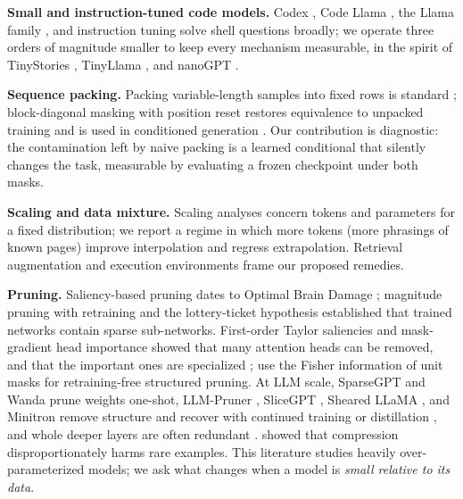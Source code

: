 \documentclass[11pt,a4paper]{article}
\begin{document}
\textbf{Small and instruction-tuned code models.} Codex \citep{chen2021codex},
Code Llama \citep{roziere2023codellama}, the Llama family
\citep{touvron2023llama,grattafiori2024llama3}, and instruction tuning
\citep{ouyang2022instructgpt} solve shell questions broadly; we operate three
orders of magnitude smaller to keep every mechanism measurable, in the spirit
of TinyStories \citep{eldan2023tinystories}, TinyLlama
\citep{zhang2024tinyllama}, and nanoGPT \citep{karpathy2023nanogpt}.

\textbf{Sequence packing.} Packing variable-length samples into fixed rows is
standard \citep{krell2021packing,dao2022flashattention}; block-diagonal
masking with position reset restores equivalence to unpacked training
\citep{krell2021packing} and is used in conditioned generation
\citep{copet2023musicgen}. Our contribution is diagnostic: the contamination
left by naive packing is a learned conditional that silently changes the task,
measurable by evaluating a frozen checkpoint under both masks.

\textbf{Scaling and data mixture.} Scaling analyses
\citep{kaplan2020scaling,hoffmann2022chinchilla} concern tokens and parameters
for a fixed distribution; we report a regime in which more tokens (more
phrasings of known pages) improve interpolation and regress extrapolation.
Retrieval augmentation \citep{lewis2020rag,borgeaud2022retro} and execution
environments \citep{yang2023intercode} frame our proposed remedies.

\textbf{Pruning.} Saliency-based pruning dates to Optimal Brain Damage
\citep{lecun1990obd}; magnitude pruning with retraining
\citep{han2015learning} and the lottery-ticket hypothesis
\citep{frankle2019lottery} established that trained networks contain sparse
sub-networks. First-order Taylor saliencies \citep{molchanov2017pruning} and
mask-gradient head importance \citep{michel2019sixteen} showed that many
attention heads can be removed, and that the important ones are specialized
\citep{voita2019heads}; \citet{kwon2022fast} use the Fisher information of
unit masks for retraining-free structured pruning. At LLM scale, SparseGPT
\citep{frantar2023sparsegpt} and Wanda \citep{sun2024wanda} prune weights
one-shot, LLM-Pruner \citep{ma2023llmpruner}, SliceGPT
\citep{ashkboos2024slicegpt}, Sheared LLaMA \citep{xia2024sheared}, and
Minitron \citep{muralidharan2024minitron} remove structure and recover with
continued training or distillation \citep{hinton2015distilling}, and whole
deeper layers are often redundant \citep{men2024shortgpt,gromov2024deeper}.
\citet{hooker2019forget} showed that compression disproportionately harms
rare examples. This literature studies heavily over-parameterized models; we
ask what changes when a model is \emph{small relative to its data}.
\end{document}
